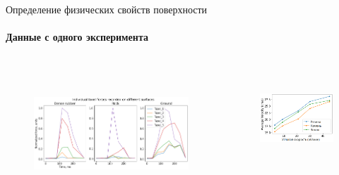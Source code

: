 \documentclass[aspectratio=169,xcolor=table,10pt]{beamer}
\begin{document}
\begin{frame}[t]{Определение физических свойств поверхности}
    \framesubtitle{Данные с одного эксперимента}
    \begin{columns}[T,onlytextwidth]
        \begin{column}{0.60\textwidth}
            \begin{figure}[H]
                \centering\includegraphics[height=5cm,width=1\textwidth,keepaspectratio]{s_shape_leg/TaxelIndForce.png}
            \end{figure}
        \end{column}
        \begin{column}{0.35\textwidth}
            \vspace{-1.4cm}
            \begin{figure}[H]
                \centering\includegraphics[height=3.8cm,width=1\textwidth,keepaspectratio]{s_shape_leg/avg_lin_vel_rev_min.png}
            \end{figure}


\end{column}
\end{columns}
\end{frame}
\end{document}
